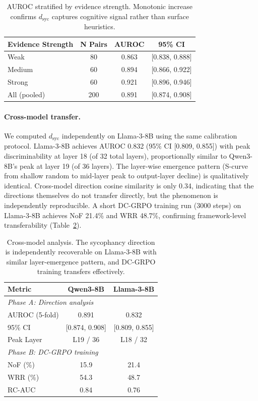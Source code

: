 \documentclass[11pt,a4paper]{article}
\newcommand{\dsyc}{d_{\text{syc}}}
\begin{document}
\begin{table}[t]
\centering
\small
\begin{tabular}{lccc}
\toprule
\textbf{Evidence Strength} & \textbf{N Pairs} & \textbf{AUROC} & \textbf{95\% CI} \\
\midrule
Weak & 80 & 0.863 & [0.838, 0.888] \\
Medium & 60 & 0.894 & [0.866, 0.922] \\
Strong & 60 & 0.921 & [0.896, 0.946] \\
All (pooled) & 200 & 0.891 & [0.874, 0.908] \\
\bottomrule
\end{tabular}
\caption{AUROC stratified by evidence strength. Monotonic increase confirms $\dsyc$ captures cognitive signal rather than surface heuristics.}
\label{tab:evidence_auroc}
\end{table}

\paragraph{Cross-model transfer.}
We computed $\dsyc$ independently on Llama-3-8B using the same calibration protocol. Llama-3-8B achieves AUROC 0.832 (95\% CI [0.809, 0.855]) with peak discriminability at layer 18 (of 32 total layers), proportionally similar to Qwen3-8B's peak at layer 19 (of 36 layers). The layer-wise emergence pattern (S-curve from shallow random to mid-layer peak to output-layer decline) is qualitatively identical. Cross-model direction cosine similarity is only 0.34, indicating that the directions themselves do not transfer directly, but the phenomenon is independently reproducible. A short DC-GRPO training run (3000 steps) on Llama-3-8B achieves NoF 21.4\% and WRR 48.7\%, confirming framework-level transferability (Table~\ref{tab:cross_model}).

\begin{table}[t]
\centering
\small
\begin{tabular}{lcc}
\toprule
\textbf{Metric} & \textbf{Qwen3-8B} & \textbf{Llama-3-8B} \\
\midrule
\multicolumn{3}{l}{\textit{Phase A: Direction analysis}} \\
AUROC (5-fold) & 0.891 & 0.832 \\
95\% CI & [0.874, 0.908] & [0.809, 0.855] \\
Peak Layer & L19 / 36 & L18 / 32 \\
\midrule
\multicolumn{3}{l}{\textit{Phase B: DC-GRPO training}} \\
NoF (\%) & 15.9 & 21.4 \\
WRR (\%) & 54.3 & 48.7 \\
RC-AUC & 0.84 & 0.76 \\
\bottomrule
\end{tabular}
\caption{Cross-model analysis. The sycophancy direction is independently recoverable on Llama-3-8B with similar layer-emergence pattern, and DC-GRPO training transfers effectively.}
\label{tab:cross_model}
\end{table}
\end{document}
